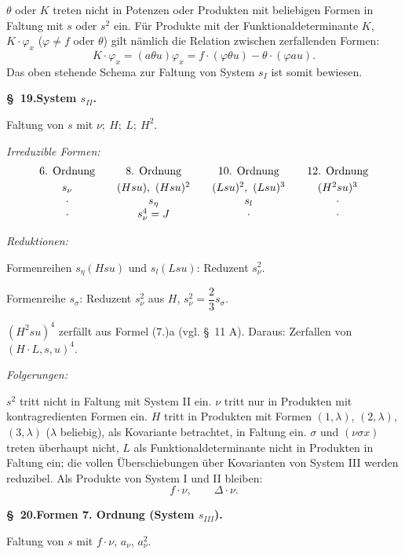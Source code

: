 \documentclass[11pt]{article}
\newcommand{\A}{\Delta}
\begin{document}
$\theta$ oder $K$ treten nicht in Potenzen oder Produkten mit beliebigen Formen in Faltung mit $s$ oder $s^2$ ein. Für Produkte mit der Funktionaldeterminante $K$, $K\cdot\varphi_x$ ($\varphi\ne f$ oder $\theta$) gilt nämlich die Relation zwischen zerfallenden Formen:
\[
 K\cdot\varphi_x=(a\theta u)\varphi_x=f\cdot(\varphi\theta u)-\theta\cdot(\varphi au).
\]
Das oben stehende Schema zur Faltung von System $s_I$ ist somit bewiesen.

\begin{center}
\textbf{\S\ 19.\quad System $s_{II}$.}
\end{center}

Faltung von $s$ mit $\nu;\ H;\ L;\ H^2$.

\noindent\emph{Irreduzible Formen:}
\[
\begin{array}{c@{\qquad}c@{\qquad}c@{\qquad}c}
\text{6. Ordnung} & \text{8. Ordnung} & \text{10. Ordnung} & \text{12. Ordnung}\\[0.3em]
s_\nu & (Hsu),\ (Hsu)^2 & (Lsu)^2,\ (Lsu)^3 & (H^2su)^3\\
\cdot & s_\eta & s_l & \cdot\\
\cdot & s_\nu^4=J & \cdot & \cdot
\end{array}
\]

\noindent\emph{Reduktionen:}

Formenreihen $s_\eta(Hsu)$ und $s_l(Lsu)$: Reduzent $s_\nu^2$.

Formenreihe $s_\sigma$: Reduzent $s_\nu^2$ aus $H$, $s_\nu^2=\dfrac23s_\sigma$.

$(H^2su)^4$ zerfällt aus Formel (7.)a (vgl. \S\ 11 A). Daraus: Zerfallen von $(H\cdot L,s,u)^4$.

\noindent\emph{Folgerungen:}

$s^2$ tritt nicht in Faltung mit System II ein. $\nu$ tritt nur in Produkten mit kontragredienten Formen ein. $H$ tritt in Produkten mit Formen $(1,\lambda)$, $(2,\lambda)$, $(3,\lambda)$ ($\lambda$ beliebig), als Kovariante betrachtet, in Faltung ein. $\sigma$ und $(\nu\sigma x)$ treten überhaupt nicht, $L$ als Funktionaldeterminante nicht in Produkten in Faltung ein; die vollen Überschiebungen über Kovarianten von System III werden reduzibel. Als Produkte von System I und II bleiben:
\[
 f\cdot\nu,\qquad \A\cdot\nu.
\]

\begin{center}
\textbf{\S\ 20.\quad Formen 7. Ordnung (System $s_{III}$).}
\end{center}

Faltung von $s$ mit $f\cdot\nu$, $a_\nu$, $a_\nu^2$.
\end{document}
